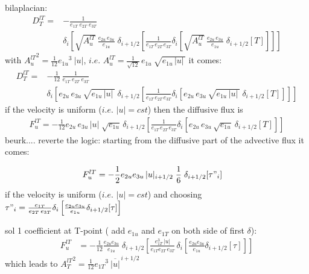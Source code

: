\documentclass[../tex_main/NEMO_manual]{subfiles}
\begin{document}
bilaplacian:
\begin{equation} \label{eq:tra_ldf_lap}
\begin{split}
D_T^{lT} =&-\frac{1}{e_{1T} \; e_{2T}\;  e_{3T}} \\
& \delta _i \left[  \sqrt{A_u^{lT}}\ \frac{e_{2u}\,e_{3u}}{e_{1u}}\;\delta _{i+1/2} 
		  \left[ \frac{1}{e_{1T}\,e_{2T}\, e_{3T}}
    \delta _i \left[ \sqrt{A_u^{lT}}\ \frac{e_{2u}\,e_{3u}}{e_{1u}}\;\delta _{i+1/2} 
    		  [T] \right] \right] \right]
\end{split}
\end{equation}
with ${A_u^{lT}}^2 = \frac{1}{12} {e_{1u}}^3\ |u|$, 
$i.e.$ $A_u^{lT} = \frac{1}{\sqrt{12}} \,e_{1u}\ \sqrt{ e_{1u}\,|u|\,}$
it comes:
\begin{equation} \label{eq:tra_ldf_lap}
\begin{split}
D_T^{lT} =&-\frac{1}{12}\,\frac{1}{e_{1T} \; e_{2T}\;  e_{3T}} \\
& \delta _i \left[ e_{2u}\,e_{3u}\,\sqrt{ e_{1u}\,|u|\,}\;\delta _{i+1/2} 
		 \left[ \frac{1}{e_{1T}\,e_{2T}\, e_{3T}} 
    \delta _i \left[ e_{2u}\,e_{3u}\,\sqrt{ e_{1u}\,|u|\,}\;\delta _{i+1/2} 
    		[T] \right] \right] \right]
\end{split}
\end{equation}
if the velocity is uniform ($i.e.$ $|u|=cst$) then the diffusive flux is
\begin{equation} \label{eq:tra_ldf_lap}
\begin{split}
F_u^{lT} = - \frac{1}{12}
 e_{2u}\,e_{3u}\,|u| \;\sqrt{ e_{1u}}\,\delta _{i+1/2} 
		 \left[ \frac{1}{e_{1T}\,e_{2T}\, e_{3T}} 
    \delta _i \left[ e_{2u}\,e_{3u}\,\sqrt{ e_{1u}}\:\delta _{i+1/2} 
    		[T] \right] \right]
\end{split}
\end{equation}
beurk....  reverte the logic: starting from the diffusive part of the advective flux it comes:

\begin{equation} \label{eq:tra_adv_ubs2}
\begin{split}
F_u^{lT}
&= - \frac{1}{2} e_{2u} e_{3u}\,|u|_{i+1/2} \;\frac{1}{6} \;\delta_{i+1/2}[\tau"_i]
\end{split}
\end{equation}
if the velocity is uniform ($i.e.$ $|u|=cst$) and
choosing $\tau "_i =\frac{e_{1T}}{e_{2T}\,e_{3T}}\delta _i \left[ \frac{e_{2u} e_{3u} }{e_{1u} } \delta _{i+1/2}[\tau] \right]$

sol 1 coefficient at T-point ( add $e_{1u}$ and $e_{1T}$ on both side of first $\delta$):
\begin{equation} \label{eq:tra_adv_ubs2}
\begin{split}
F_u^{lT}
&= - \frac{1}{12} \frac{e_{2u} e_{3u}}{e_{1u}}\;\delta_{i+1/2}\left[ \frac{e_{1T}^3\,|u|}{e_{1T}e_{2T}\,e_{3T}}\,\delta _i \left[ \frac{e_{2u} e_{3u} }{e_{1u} } \delta _{i+1/2}[\tau] \right] \right]
\end{split}
\end{equation}
which leads to ${A_T^{lT}}^2 = \frac{1}{12} {e_{1T}}^3\ \overline{|u|}^{\,i+1/2}$
\end{document}
